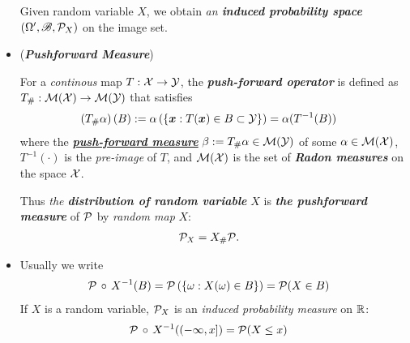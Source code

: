 \documentclass[11pt]{article}
\begin{document}
\begin{itemize}
\begin{definition}
Given random variable $X$, we obtain \emph{an \textbf{induced probability space}} $(\Omega', {\mathscr B}, {\mathcal P}_X)$ on the image set.
\end{definition}

\item \begin{remark} (\emph{\textbf{Pushforward Measure}})
\begin{definition} For a \emph{continous} map $T : {\mathcal X} \rightarrow {\mathcal Y}$,  the \textbf{\emph{push-forward operator}} is defined as $T_{\#}: {\mathcal M}({\mathcal X}) \rightarrow {\mathcal M}({\mathcal Y})$ that  satisfies 
\begin{align*}
\left(T_{\#}\alpha\right)(B)&:= \alpha\left(\left\{ \boldsymbol{x}: T(\boldsymbol{x}) \in B \subset {\mathcal Y} \right\}\right) = \alpha(T^{-1}(B))  
\end{align*} where the \underline{\textbf{\emph{push-forward measure}}} $\beta := T_{\#}\alpha \in {\mathcal M}({\mathcal Y})$ of some $\alpha \in  {\mathcal M}({\mathcal X})$, $T^{-1}(\cdot)$ is the \emph{pre-image} of $T$, and ${\mathcal M}({\mathcal X})$ is the set of \emph{\textbf{Radon measures}} on the space ${\mathcal X}$. 
\end{definition} 

Thus \emph{the \textbf{distribution of random variable}} $X$ is \emph{\textbf{the pushforward measure}} of ${\mathcal P}$ by \emph{random map} $X$:
\begin{align*}
{\mathcal P}_{X} &= X_{\#}{\mathcal P}.
\end{align*}
\end{remark}

\item \begin{remark}
Usually we write
\begin{align*}
{\mathcal P}\,\circ\, X^{-1}(B) &=  {\mathcal P}\left(\left\{\omega: X(\omega) \in B\right\}\right) = {\mathcal P}(X \in B)
\end{align*}
If $X$ is a random variable, ${\mathcal P}_X$ is an \emph{induced probability measure} on ${\mathbb R}$:
\begin{align*}
{\mathcal P}\,\circ\, X^{-1}((-\infty, x]) &= {\mathcal P}(X \le x)
\end{align*}
\end{remark}


%
%


\end{itemize}
\end{document}
